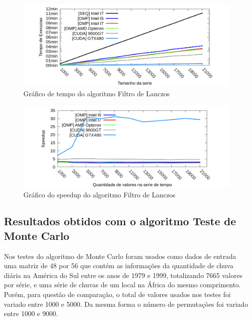 \begin{figure}[H]
\centering
\includegraphics[width=1.0\textwidth]{Imagens/graficos_lanczos/lanczos_tempos.png}
\caption{Gráfico de tempo do algoritmo Filtro de Lanczos}
\label{fig:grafico_tempo_lanczos}
\end{figure}

\begin{figure}[H]
\centering
\includegraphics[width=1.0\textwidth]{Imagens/graficos_lanczos/lanczos_speedup.png}
\caption{Gráfico do speedup do algoritmo Filtro de Lanczos}
\label{fig:grafico_speedup_lanczos}
\end{figure}

\subsection{Resultados obtidos com o algoritmo Teste de Monte Carlo}

Nos testes do algoritmo de Monte Carlo foram usados como dados de entrada uma matriz de 48 por 56 que contém as informações da quantidade de chuva diária na América do Sul entre os anos de 1979 e 1999, totalizando 7665 valores por série, e uma série de chuvas de um local na África do mesmo comprimento.
Porém, para questão de comparação, o total de valores usados nos testes foi variado entre 1000 e 5000. Da mesma forma o número de permutações foi variado entre 1000 e 9000.

